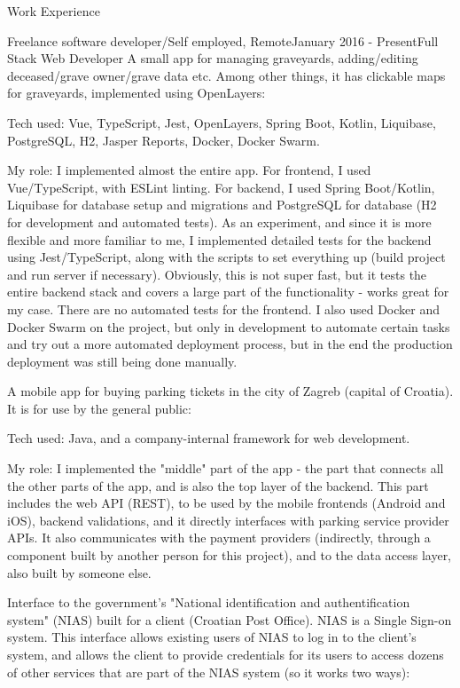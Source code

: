 \documentclass{resume}
\begin{document}
\begin{rSection}{Work Experience}
\begin{rSubsection}{Freelance software developer/Self employed, Remote}{January 2016 - Present}{Full Stack Web Developer}{}
A small app for managing graveyards, adding/editing deceased/grave owner/grave data etc. Among other things, it has clickable maps for graveyards, implemented using OpenLayers:

\begin{rList}
\item Tech used: Vue, TypeScript, Jest, OpenLayers, Spring Boot, Kotlin, Liquibase, PostgreSQL, H2, Jasper Reports, Docker, Docker Swarm.
\item My role: I implemented almost the entire app. For frontend, I used Vue/TypeScript, with ESLint linting. For backend, I used Spring Boot/Kotlin, Liquibase for database setup and migrations and PostgreSQL for database (H2 for development and automated tests). As an experiment, and since it is more flexible and more familiar to me, I implemented detailed tests for the backend using Jest/TypeScript, along with the scripts to set everything up (build project and run server if necessary). Obviously, this is not super fast, but it tests the entire backend stack and covers a large part of the functionality - works great for my case. There are no automated tests for the frontend. I also used Docker and Docker Swarm on the project, but only in development to automate certain tasks and try out a more automated deployment process, but in the end the production deployment was still being done manually.
\end{rList}

A mobile app for buying parking tickets in the city of Zagreb (capital of Croatia). It is for use by the general public:

\begin{rList}
\item Tech used: Java, and a company-internal framework for web development.
\item My role: I implemented the "middle" part of the app - the part that connects all the other parts of the app, and is also the top layer of the backend. This part includes the web API (REST), to be used by the mobile frontends (Android and iOS), backend validations, and it directly interfaces with parking service provider APIs. It also communicates with the payment providers (indirectly, through a component built by another person for this project), and to the data access layer, also built by someone else.
\end{rList}

Interface to the government's "National identification and authentification system" (NIAS) built for a client (Croatian Post Office). NIAS is a Single Sign-on system. This interface allows existing users of NIAS to log in to the client's system, and allows the client to provide credentials for its users to access dozens of other services that are part of the NIAS system (so it works two ways):


\end{rSubsection}
\end{rSection}
\end{document}
